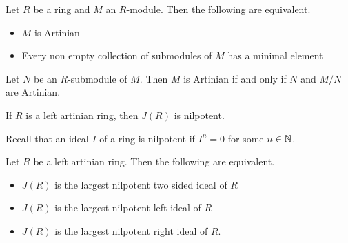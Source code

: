 \documentclass[a4paper]{article}
\begin{document}
\begin{prp}{}{} Let $R$ be a ring and $M$ an $R$-module. Then the following are equivalent. 
\begin{itemize}
\item $M$ is Artinian
\item Every non empty collection of submodules of $M$ has a minimal element
\end{itemize}
\end{prp}

\begin{prp}{}{} Let $N$ be an $R$-submodule of $M$. Then $M$ is Artinian if and only if $N$ and $M/N$ are Artinian. 
\end{prp}

\begin{thm}{}{} If $R$ is a left artinian ring, then $J(R)$ is nilpotent. 
\end{thm}

Recall that an ideal $I$ of a ring is nilpotent if $I^n=0$ for some $n\in\mathbb{N}$. 

\begin{crl}{}{} Let $R$ be a left artinian ring. Then the following are equivalent. 
\begin{itemize}
\item $J(R)$ is the largest nilpotent two sided ideal of $R$
\item $J(R)$ is the largest nilpotent left ideal of $R$
\item $J(R)$ is the largest nilpotent right ideal of $R$. 
\end{itemize}
\end{crl}
\end{document}
